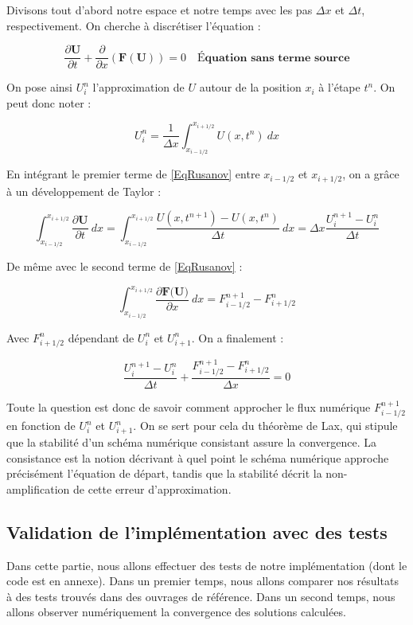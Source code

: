 \documentclass[
11pt, %
francais, %
singlespacing, %
headsepline, %
]{MastersDoctoralThesis} %
\begin{document}
Divisons tout d'abord notre espace et notre temps avec les pas $\Delta x$ et $\Delta t$, respectivement. On cherche à discrétiser l'équation : 

$$\frac{\partial\textbf{U}}{\partial t}+\frac{\partial}{\partial x}(\textbf{F} (\textbf{U})) = 0 \quad \textbf{Équation sans terme source} \label{EqRusanov} $$

On pose ainsi $U_i ^n$ l'approximation de $U$ autour de la position $x_i$ à l'étape $t^n$. On peut donc noter :

$$ U_i ^n = \frac{1}{\Delta x}\int_{x_{i-1/2}}^{x_{i+1/2}} U(x,t^n) \ dx $$

En intégrant le premier terme de \ref{EqRusanov} entre $x_{i-1/2}$ et $x_{i+1/2}$, on a grâce à un développement de Taylor :

$$ \int_{x_{i-1/2}}^{x_{i+1/2}} \frac{\partial\textbf{U}}{\partial t} \ dx = \int_{x_{i-1/2}}^{x_{i+1/2}} \frac{U(x,t^{n+1}) - U(x,t^{n})}{\Delta t} \ dx = \Delta x \frac{ U_i ^{n+1} - U_i ^{n}}{\Delta t} $$

De même avec le second terme de \ref{EqRusanov} : 

$$ \int_{x_{i-1/2}}^{x_{i+1/2}} \frac{\partial\textbf{F(U)}}{\partial x} \ dx =  F_{i-1/2} ^{n+1} - F_{i+1/2} ^{n} $$

Avec $F_{i+1/2} ^n$ dépendant de $U_i ^n$ et $U_{i+1} ^n$.
On a finalement :

$$ \frac{ U_i ^{n+1} - U_i ^{n}}{\Delta t} + \frac{ F_{i-1/2} ^{n+1} - F_{i+1/2} ^{n} }{\Delta x} = 0 $$

Toute la question est donc de savoir comment approcher le flux numérique $F_{i-1/2} ^{n+1}$ en fonction de $U_i ^n$ et $U_{i+1} ^n$. On se sert pour cela du théorème de Lax, qui stipule que la stabilité d'un schéma numérique consistant assure la convergence. La consistance est la notion décrivant à quel point le schéma numérique approche précisément l'équation de départ, tandis que la stabilité décrit la non-amplification de cette erreur d'approximation.


\subsection{Validation de l'implémentation avec des tests}

Dans cette partie, nous allons effectuer des tests de notre implémentation (dont le code est en annexe).
Dans un premier temps, nous allons comparer nos résultats à des tests trouvés dans des ouvrages de référence.
Dans un second temps, nous allons observer numériquement la convergence des solutions calculées.
\end{document}
